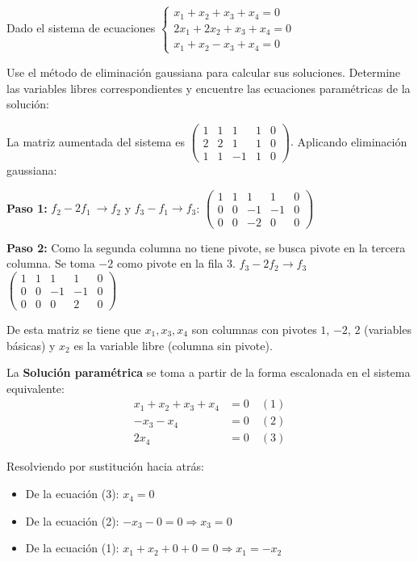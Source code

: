\begin{example} Dado el sistema de ecuaciones $\begin{cases}
x_1+x_2+x_3+x_4=0\\
2x_1+2x_2+x_3+x_4=0\\
x_1+x_2-x_3+x_4=0
\end{cases}$ 

Use el método de eliminación gaussiana para calcular sus soluciones. Determine las variables libres correspondientes y encuentre las ecuaciones paramétricas de la solución: 

\begin{myproof} La matriz aumentada del sistema es 
$\left(\begin{array}{cccc|c}
1 & 1 & 1 & 1 & 0 \\
2 & 2 & 1 & 1 & 0 \\
1 & 1 & -1 & 1 & 0
\end{array}\right).$ Aplicando eliminación gaussiana:

\textbf{Paso 1:} $f_2 - 2f_1\ \to f_2$ y $f_3 - f_1\to f_3$: $\left(\begin{array}{cccc|c}
1 & 1 & 1 & 1 & 0 \\
0 & 0 & -1 & -1 & 0 \\
0 & 0 & -2 & 0 & 0
\end{array}\right)$

\textbf{Paso 2:} Como la segunda columna no tiene pivote, se busca pivote en la tercera columna. Se toma $-2$ como pivote en la fila 3. $f_3 - 2f_2\to f_3$
$\left(\begin{array}{cccc|c}
\boxed{1} & 1 & 1 & 1 & 0 \\
0 & 0 & \boxed{-1} & -1 & 0 \\
0 & 0 & 0 & \boxed{2} & 0
\end{array}\right)$

De esta matriz se tiene que $x_1, x_3, x_4$ son columnas con pivotes  $1$, $-2$, $2$ (variables básicas) y $x_2$ es la variable libre (columna sin pivote).

La \textbf{Solución paramétrica} se toma a partir de la forma escalonada en el sistema equivalente:
\begin{align*}
x_1 + x_2 + x_3 + x_4 &= 0 \quad (1)\\
-x_3 - x_4 &= 0 \quad (2)\\
2x_4 &= 0 \quad (3)
\end{align*}

Resolviendo por sustitución hacia atrás: 
\begin{itemize}
\item De la ecuación (3): $x_4 = 0$
\item De la ecuación (2): $-x_3 - 0 = 0 \Rightarrow x_3 = 0$
\item De la ecuación (1): $x_1 + x_2 + 0 + 0 = 0 \Rightarrow x_1 = -x_2$
\end{itemize}


\end{myproof}
\end{example}
